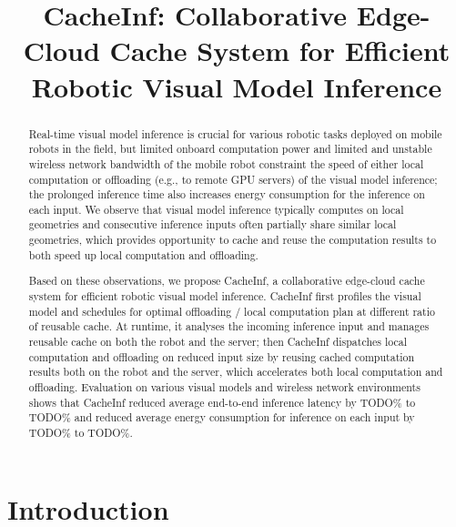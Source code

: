 \documentclass[nonacm,sigplan]{acmart}
\begin{document}
\title{CacheInf: Collaborative Edge-Cloud Cache System for Efficient Robotic Visual Model Inference}


\begin{abstract}
  Real-time visual model inference is crucial for various robotic tasks deployed on mobile robots in the field, but limited onboard computation power and limited and unstable wireless network bandwidth of the mobile robot constraint the speed of either local computation or offloading (e.g., to remote GPU servers) of the visual model inference; the prolonged inference time also increases energy consumption for the inference on each input.
  We observe that visual model inference typically computes on local geometries and consecutive inference inputs often partially share similar local geometries, which provides opportunity to cache and reuse the computation results to both speed up local computation and offloading.

  Based on these observations, we propose CacheInf, a collaborative edge-cloud cache system for efficient robotic visual model inference.
  CacheInf first profiles the visual model and schedules for optimal offloading / local computation plan at different ratio of reusable cache.
  At runtime, it analyses the incoming inference input and manages reusable cache on both the robot and the server; then CacheInf dispatches local computation and offloading on reduced input size by reusing cached computation results both on the robot and the server, which accelerates both local computation and offloading.
  Evaluation on various visual models and wireless network environments shows that CacheInf reduced average end-to-end inference latency by TODO\% to TODO\% and reduced average energy consumption for inference on each input by TODO\% to TODO\%.

\end{abstract}

\maketitle %
\pagestyle{plain} %


\section{Introduction}

\end{document}
